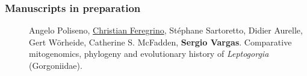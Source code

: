 \documentclass[letter,10pt]{article}
\begin{document}
\subsubsection*{Manuscripts in preparation}
\begin{description}



\item[]Angelo Poliseno, \underline{Christian Feregrino}, St\'ephane Sartoretto, Didier Aurelle, Gert W\"orheide, Catherine S. McFadden, \textbf{Sergio Vargas}. Comparative mitogenomics, phylogeny and evolutionary history of \emph{Leptogorgia} (Gorgoniidae).

\end{description}



\end{document}
